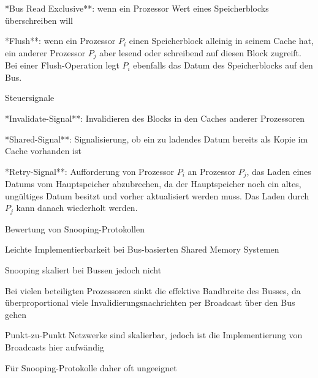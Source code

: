 \documentclass[10pt,landscape]{article}
\begin{document}
\begin{multicols}{3}
\begin{itemize*}
\begin{itemize*}
      \item **Bus Read Exclusive**: wenn ein Prozessor Wert eines Speicherblocks überschreiben will
      \item **Flush**: wenn ein Prozessor $P_i$ einen Speicherblock alleinig in seinem Cache hat, ein anderer Prozessor $P_j$ aber lesend oder schreibend auf diesen Block zugreift. Bei einer Flush-Operation legt $P_i$ ebenfalls das Datum des Speicherblocks auf den Bus.
    \end{itemize*}
    \item Steuersignale
    \begin{itemize*}
      \item **Invalidate-Signal**: Invalidieren des Blocks in den Caches anderer Prozessoren
      \item **Shared-Signal**: Signalisierung, ob ein zu ladendes Datum bereits als Kopie im Cache vorhanden ist
      \item **Retry-Signal**: Aufforderung von Prozessor $P_i$ an Prozessor $P_j$, das Laden eines Datums vom Hauptspeicher abzubrechen, da der Hauptspeicher noch ein altes, ungültiges Datum besitzt und vorher aktualisiert werden muss. Das Laden durch $P_j$ kann danach wiederholt werden.
    \end{itemize*}
    \item %
    \item %
    \item %
    \item Bewertung von Snooping-Protokollen
    \begin{itemize*}
      \item Leichte Implementierbarkeit bei Bus-basierten Shared Memory Systemen
      \item Snooping skaliert bei Bussen jedoch nicht
      \item Bei vielen beteiligten Prozessoren sinkt die effektive Bandbreite des Busses, da überproportional viele Invalidierungsnachrichten per Broadcast über den Bus gehen
      \item Punkt-zu-Punkt Netzwerke sind skalierbar, jedoch ist die Implementierung von Broadcasts hier aufwändig
      \item Für Snooping-Protokolle daher oft ungeeignet
    \end{itemize*}
  \end{itemize*}
  

\end{multicols}
\end{document}
